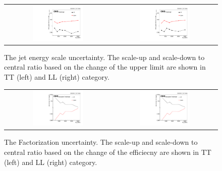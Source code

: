 \begin{itemize}
  \begin{figure}[t]
  \centering
 \begin{tabular}{cc}
    \includegraphics[width=0.5\textwidth]{Figures/plots_uncert/JEC_TT.pdf} &
   \includegraphics[width=0.5\textwidth]{Figures/plots_uncert/JEC_LL.pdf} \\
  \end{tabular}
  \caption{The jet energy scale uncertainty. The scale-up and scale-down to central ratio based on the change of the upper limit are shown in TT (left) and LL (right) category.}
  \label{fig:hvt_brs}
\end{figure} 

 \begin{figure}[t]
  \centering
 \begin{tabular}{cc}
    \includegraphics[width=0.5\textwidth]{Figures/scl/scl_TT.pdf} &
   \includegraphics[width=0.5\textwidth]{Figures/scl/scl_TT.pdf} \\
  \end{tabular}
  \caption{The Factorization uncertainty. The scale-up and scale-down to central ratio based on the change of the efficiecny are shown in TT (left) and LL (right) category.}
  \label{fig:hvt_brs}
\end{figure} 


\end{itemize}
